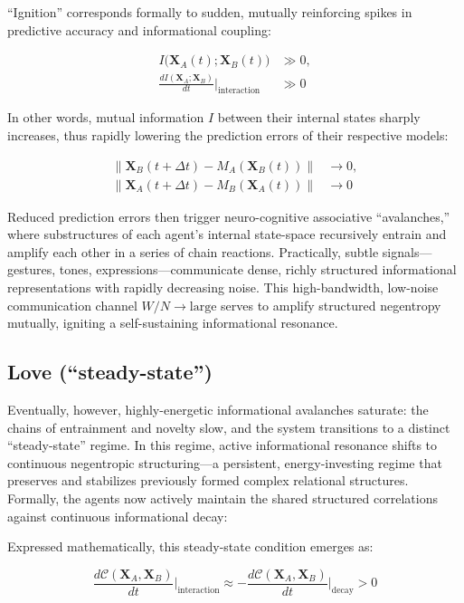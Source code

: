 ``Ignition'' corresponds formally to sudden, mutually reinforcing spikes in predictive accuracy and informational coupling:

\begin{align*}
I\big(\mathbf{X}_A(t); \mathbf{X}_B(t)\big) &\gg 0,\\
\frac{dI(\mathbf{X}_A;\mathbf{X}_B)}{dt}\Big|_{\text{interaction}} &\gg 0
\end{align*}

In other words, mutual information $I$ between their internal states sharply increases, thus rapidly lowering the prediction errors of their respective models:

\begin{align*}
\lVert \mathbf{X}_B(t + \Delta t) - M_A(\mathbf{X}_B(t)) \rVert &\rightarrow 0,\\
\lVert \mathbf{X}_A(t + \Delta t) - M_B(\mathbf{X}_A(t)) \rVert &\rightarrow 0
\end{align*}

Reduced prediction errors then trigger neuro-cognitive associative ``avalanches,'' where substructures of each agent's internal state-space recursively entrain and amplify each other in a series of chain reactions. Practically, subtle signals---gestures, tones, expressions---communicate dense, richly structured informational representations with rapidly decreasing noise. This high-bandwidth, low-noise communication channel $W/N \to \text{large}$ serves to amplify structured negentropy mutually, igniting a self-sustaining informational resonance.

\subsection*{Love (``steady-state'')}

Eventually, however, highly-energetic informational avalanches saturate: the chains of entrainment and novelty slow, and the system transitions to a distinct ``steady-state'' regime. In this regime, active informational resonance shifts to continuous negentropic structuring---a persistent, energy-investing regime that preserves and stabilizes previously formed complex relational structures. Formally, the agents now actively maintain the shared structured correlations against continuous informational decay:

Expressed mathematically, this steady-state condition emerges as:

\begin{equation*}
\frac{d\mathcal{C}(\mathbf{X}_A,\mathbf{X}_B)}{dt}\Big|_{\text{interaction}} \approx -\frac{d\mathcal{C}(\mathbf{X}_A,\mathbf{X}_B)}{dt}\Big|_{\text{decay}} > 0
\end{equation*}

